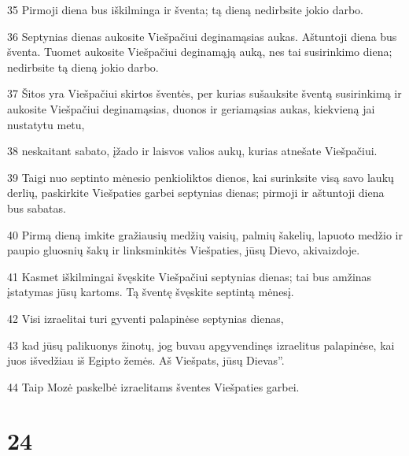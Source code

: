 \par 35 Pirmoji diena bus iškilminga ir šventa; tą dieną nedirbsite jokio darbo. 
\par 36 Septynias dienas aukosite Viešpačiui deginamąsias aukas. Aštuntoji diena bus šventa. Tuomet aukosite Viešpačiui deginamąją auką, nes tai susirinkimo diena; nedirbsite tą dieną jokio darbo. 
\par 37 Šitos yra Viešpačiui skirtos šventės, per kurias sušauksite šventą susirinkimą ir aukosite Viešpačiui deginamąsias, duonos ir geriamąsias aukas, kiekvieną jai nustatytu metu, 
\par 38 neskaitant sabato, įžado ir laisvos valios aukų, kurias atnešate Viešpačiui. 
\par 39 Taigi nuo septinto mėnesio penkioliktos dienos, kai surinksite visą savo laukų derlių, paskirkite Viešpaties garbei septynias dienas; pirmoji ir aštuntoji diena bus sabatas. 
\par 40 Pirmą dieną imkite gražiausių medžių vaisių, palmių šakelių, lapuoto medžio ir paupio gluosnių šakų ir linksminkitės Viešpaties, jūsų Dievo, akivaizdoje. 
\par 41 Kasmet iškilmingai švęskite Viešpačiui septynias dienas; tai bus amžinas įstatymas jūsų kartoms. Tą šventę švęskite septintą mėnesį. 
\par 42 Visi izraelitai turi gyventi palapinėse septynias dienas, 
\par 43 kad jūsų palikuonys žinotų, jog buvau apgyvendinęs izraelitus palapinėse, kai juos išvedžiau iš Egipto žemės. Aš Viešpats, jūsų Dievas”. 
\par 44 Taip Mozė paskelbė izraelitams šventes Viešpaties garbei.



\chapter{24}


